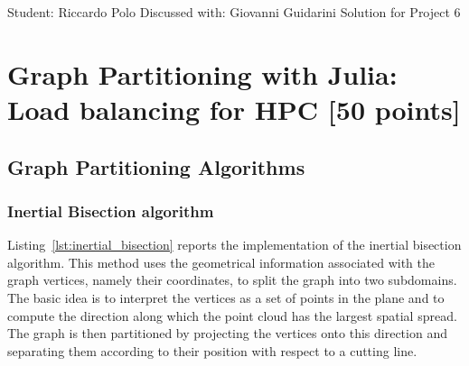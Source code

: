 \documentclass[unicode,10pt,a4paper,oneside,numbers=endperiod,openany]{scrartcl}
\begin{document}
\setassignment
{}

            {Student: Riccardo Polo}
            {Discussed with: Giovanni Guidarini}
            {Solution for Project 6}{}
\newline

\assignmentpolicy

\newpage

\section{Graph Partitioning with Julia: Load balancing for HPC [50 points]}
\subsection{Graph Partitioning Algorithms}
\subsubsection{Inertial Bisection algorithm}

Listing~\ref{lst:inertial_bisection} reports the implementation of the inertial bisection algorithm. 
This method uses the geometrical information associated with the graph vertices, namely their
coordinates, to split the graph into two subdomains. The basic idea is to interpret the vertices as a
set of points in the plane and to compute the direction along which the point cloud has the largest
spatial spread. The graph is then partitioned by projecting the vertices onto this direction and
separating them according to their position with respect to a cutting line.
\end{document}
